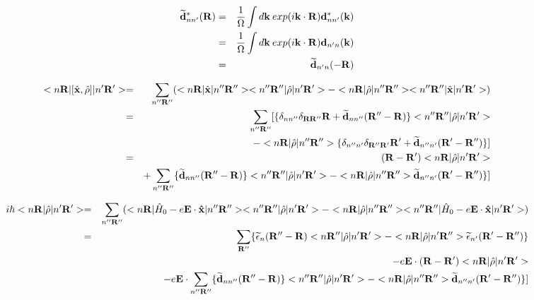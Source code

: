 \documentclass[aps,prb,preprint]{revtex4-1}
\begin{document}
\begin{appendix}
\begin{eqnarray}
 \widetilde{\bf d}^*_{nn'}({\bf R}) =&& \frac{1}{\Omega} \int d{\bf k} \: exp( i{\bf k} \cdot {\bf R} ) {\bf d}^*_{nn'}({\bf k}) \nonumber \\
 =&& \frac{1}{\Omega} \int d{\bf k} \: exp( i{\bf k} \cdot {\bf R} ) {\bf d}_{n'n}({\bf k}) \nonumber \\
 =&& \widetilde{\bf d}_{n'n}({\bf -R})
\end{eqnarray}

\begin{eqnarray}
 < n{\bf R}| [\hat{\bf x}, \hat{\rho} ]|n'{\bf R'}> = && \sum_{n''{\bf R''}} ( < n{\bf R}| \hat{\bf x}|n''{\bf R''}> < n''{\bf R''}|\hat{\rho} |n'{\bf R'}> -< n{\bf R}| \hat{\rho}|n''{\bf R''}> < n''{\bf R''}|\hat{\bf x} |n'{\bf R'}> ) \nonumber \\
 = && \sum_{n''{\bf R''}} [ \{ \delta_{nn''} \delta_{\bf RR''} {\bf R}  + {\bf \widetilde d}_{nn''}({\bf R''-R}) \} < n''{\bf R''}|\hat{\rho} |n'{\bf R'}> \nonumber \\
 &&-< n{\bf R}| \hat{\rho}|n''{\bf R''}> \{ \delta_{n''n'} \delta_{\bf R''R'} {\bf R'}  + {\bf \widetilde d}_{n''n'}({\bf R'-R''}) \} ] \nonumber \\
  = && ({\bf R-R'}) < n{\bf R}|\hat{\rho} |n'{\bf R'}>  \nonumber \\
  && + \sum_{n''{\bf R''}} \{ {\bf \widetilde d}_{nn''}({\bf R''-R}) \} < n''{\bf R''}|\hat{\rho} |n'{\bf R'}> -< n{\bf R}| \hat{\rho}|n''{\bf R''}> {\bf \widetilde d}_{n''n'}({\bf R'-R''}) \} ] \nonumber \\
\end{eqnarray} 

\begin{eqnarray}
 i \hbar < n{\bf R}| \hat{\rho} |n'{\bf R'}> = && \sum_{n''{\bf R''}} ( < n{\bf R}| \hat{H}_0 -e{\bf E} \cdot {\bf \hat{x}} |n''{\bf R''}> < n''{\bf R''}|\hat{\rho} |n'{\bf R'}> -< n{\bf R}| \hat{\rho}|n''{\bf R''}> < n''{\bf R''}|\hat{H}_0 -e{\bf E} \cdot {\bf \hat{x}} |n'{\bf R'}> ) \nonumber \\
 =&& \sum_{\bf R''} \{ \widetilde{\epsilon}_{n}({\bf R''- R} )  < n{\bf R''}|\hat{\rho} |n'{\bf R'}> - < n{\bf R}| \hat{\rho}|n'{\bf R''}> \widetilde{\epsilon}_{n'}({\bf R'- R''} )   \} \nonumber \\
 && -e{\bf E} \cdot ({\bf R-R'}) < n{\bf R}|\hat{\rho} |n'{\bf R'}>\nonumber \\
 && -e{\bf E} \cdot \sum_{n''{\bf R''}} \{ {\bf \widetilde d}_{nn''}({\bf R''-R}) \} < n''{\bf R''}|\hat{\rho} |n'{\bf R'}> -< n{\bf R}| \hat{\rho}|n''{\bf R''}> {\bf \widetilde d}_{n''n'}({\bf R'-R''}) \} ] \nonumber \\ 
\end{eqnarray} 


\end{appendix}
\end{document}
